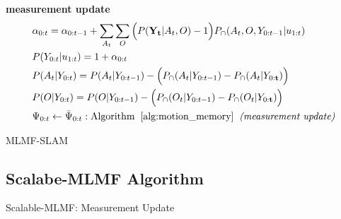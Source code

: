 \documentclass{frontiersSCNS} %
\let\oldnl\nl%
\newcommand{\nonl}{\renewcommand{\nl}{\let\nl\oldnl}}%
\begin{document}
\begin{center}
\begin{minipage}{\linewidth}
\begin{algorithm}[H]
\nonl\textbf{measurement update}
\nonl\begin{align}
 &\alpha_{0:t}       = \alpha_{0:t-1} + \sum\limits_{A_t}\sum\limits_{O} \Big(P(\mathbf{Y_t}|A_t,O) - 1\Big)P_{\cap}(A_t,O,Y_{0:t-1}|u_{1:t}) \nonumber \\
 &P(Y_{0:t}|u_{1:t}) = 1 + \alpha_{0:t} \nonumber\\
 &P(A_t|Y_{0:t})     = P(A_t|Y_{0:t-1}) - \Big(P_{\cap}(A_t|Y_{0:t-1}) -  P_{\cap}(A_t|Y_{0:\mathbf{t}}) \Big) \nonumber \\
 &P(O|Y_{0:t})       = P(O|Y_{0:t-1}) -  \Big(  P_{\cap}(O_t|Y_{0:t-1}) -  P_{\cap}(O_t|Y_{0:\mathbf{t}})\Big) \nonumber \\    
 &\Psi_{0:t} \gets \bar{\Psi}_{0:t}: \mathrm{Algorithm\;\; \ref{alg:motion_memory}\;\; \textit{(measurement update)}} \nonumber
 \end{align}
\caption{MLMF-SLAM}
\end{algorithm} 
\end{minipage}
\end{center}

\subsection{Scalabe-MLMF Algorithm}\label{app:scalable-mlmf}

\begin{center}
\begin{minipage}{\linewidth}

\begin{algorithm}[H]
\label{alg:scalabe-mrf-slam}
\BlankLine

\caption{Scalable-MLMF: Measurement Update}
\end{algorithm} 
\end{minipage}
\end{center}
\end{document}
